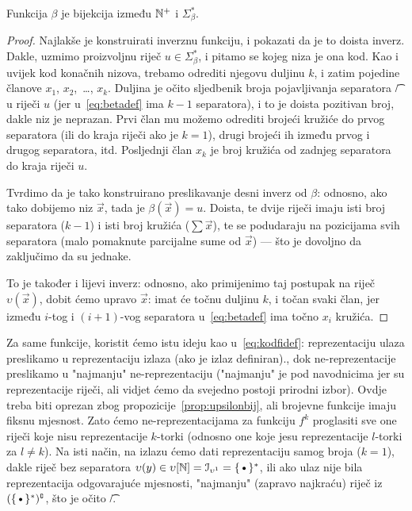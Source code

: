 \begin{propozicija}\label{prop:betabij}
Funkcija $\beta$ je bijekcija između ${\mathbb N}^+$ i $\Sigma_\beta^*$.
\end{propozicija}
\begin{proof}
Najlakše je konstruirati inverznu funkciju, i pokazati da je to doista inverz. Dakle, uzmimo proizvoljnu riječ $u\in\Sigma_\beta^*$, i pitamo se kojeg niza je ona kod. Kao i uvijek kod konačnih nizova, trebamo odrediti njegovu duljinu $k$, i zatim pojedine članove $x_1$, $x_2$,~\ldots, $x_k$. Duljina je očito sljedbenik broja pojavljivanja separatora \t/ u riječi $u$ (jer u~\eqref{eq:betadef} ima $k-1$ separatora), i to je doista pozitivan broj, dakle niz je neprazan. Prvi član mu možemo odrediti brojeći kružiće do prvog separatora (ili do kraja riječi ako je $k=1$), drugi brojeći ih između prvog i drugog separatora, itd. Posljednji član $x_k$ je broj kružića od zadnjeg separatora do kraja riječi $u$.

Tvrdimo da je tako konstruirano preslikavanje desni inverz od $\beta$: odnosno, ako tako dobijemo niz $\vec x$, tada je $\beta(\vec x)=u$. Doista, te dvije riječi imaju isti broj separatora ($k-1$) i isti broj kružića ($\sum\vec x$), te se podudaraju na pozicijama svih separatora (malo pomaknute parcijalne sume od $\vec x$) --- što je dovoljno da zaključimo da su jednake.

To je također i lijevi inverz: odnosno, ako primijenimo taj postupak na riječ $\upsilon(\vec x)$, dobit ćemo upravo $\vec x$: imat će točnu duljinu $k$, i točan svaki član, jer između $i$-tog i $(i+1)$-vog separatora u~\eqref{eq:betadef} ima točno $x_i$ kružića.
\end{proof}

Za same funkcije, koristit ćemo istu ideju kao u~\eqref{eq:kodfidef}: reprezentaciju ulaza preslikamo u reprezentaciju izlaza (ako je izlaz definiran)., dok ne-reprezentacije preslikamo u "najmanju" ne-reprezentaciju ("najmanju" je pod navodnicima jer su reprezentacije riječi, ali vidjet ćemo da svejedno postoji prirodni izbor). Ovdje treba biti oprezan zbog propozicije~\ref{prop:upsilonbij}, ali brojevne funkcije imaju fiksnu mjesnost. Zato ćemo ne-reprezentacijama za funkciju $f^k$ proglasiti sve one riječi koje nisu reprezentacije $k$-torki (odnosno one koje jesu reprezentacije $l$-torki za $l\not=k$). Na isti način, na izlazu ćemo dati reprezentaciju samog broja ($k=1$), dakle riječ bez separatora $\upsilon(y)\in\upsilon[\N]=\im{\upsilon^1}=\{\text\textbullet\}^*$, ili ako ulaz nije bila reprezentacija odgovarajuće mjesnosti, "najmanju" (zapravo najkraću) riječ iz $(\{\text\textbullet\}^*)\kompl$, što je očito \t/.

